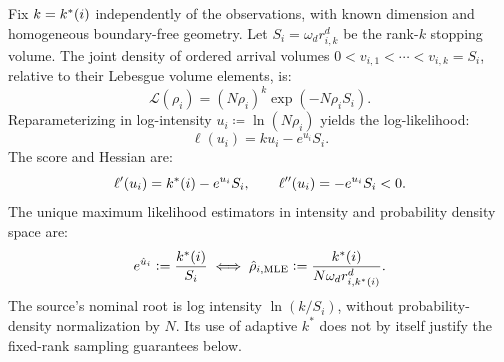 \begin{theorem}
  \label{thm:shell_mle}
  Fix $k=k^{*}(i)$ independently of the observations, with known
  dimension and homogeneous boundary-free geometry. Let
  $S_i=\omega_dr_{i,k}^d$ be the rank-$k$ stopping volume.
  The joint density of ordered arrival volumes
  $0<v_{i,1}<\cdots<v_{i,k}=S_i$, relative to their Lebesgue volume
  elements, is:
  \begin{equation}
    \mathcal{L}(\rho_i)=(N\rho_i)^k\exp(-N\rho_iS_i).
    \label{eq:joint_shell_likelihood}
  \end{equation}
  Reparameterizing in log-intensity $u_i \coloneqq \ln(N \rho_i)$
  yields the log-likelihood:
  \begin{equation}
    \ell(u_i)=ku_i-e^{u_i}S_i.
    \label{eq:log_lik_ui}
  \end{equation}
  The score and Hessian are:
  \begin{equation}
    \ell'(u_i) = k^{*}(i) - e^{u_i} S_i, \qquad \ell''(u_i) =
    -e^{u_i} S_i < 0.
    \label{eq:score_hessian_u}
  \end{equation}
  The unique maximum likelihood estimators in intensity and
  probability density space are:
  \begin{equation}
    e^{\hat{u}_i} \mathrel{\mathop:}= \frac{k^{*}(i)}{S_i} \iff \hat{\rho}_{i,
    \mathrm{MLE}} \mathrel{\mathop:}= \frac{k^{*}(i)}{N \omega_d r_{i, k^{*}(i)}^d}.
    \label{eq:mle_densities}
  \end{equation}
  The source's nominal root is log intensity $\ln(k/S_i)$, without
  probability-density normalization by $N$. Its use of adaptive $k^*$
  does not by itself justify the fixed-rank sampling guarantees below.
\end{theorem}

